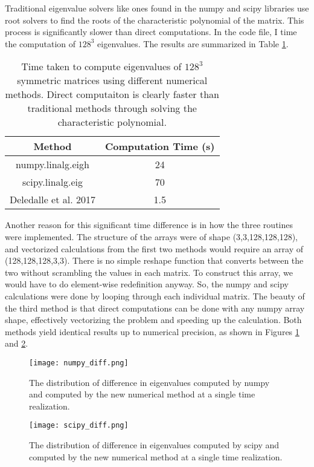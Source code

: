 \documentclass{article}
\begin{document}
Traditional eigenvalue solvers like ones found in the numpy and scipy libraries use root solvers to find the roots of the characteristic polynomial of the matrix. This process is significantly slower than direct computations. In the code file, I time the computation of $128^3$ eigenvalues. The results are summarized in Table \ref{tab:timings}.
\begin{table}[H]
    \centering
    \begin{tabular}{|c|c|}
    \hline
        Method & Computation Time (s) \\
        \hline
        \hline
         numpy.linalg.eigh&24 \\
         scipy.linalg.eig &70 \\
         Deledalle et al. 2017 & 1.5\\
         \hline
    \end{tabular}
    \caption{Time taken to compute eigenvalues of $128^3$ symmetric matrices using different numerical methods. Direct computaiton is clearly faster than traditional methods through solving the characteristic polynomial.}
    \label{tab:timings}
\end{table}
Another reason for this significant time difference is in how the three routines were implemented. The structure of the arrays were of shape (3,3,128,128,128), and vectorized calculations from the first two methods would require an array of (128,128,128,3,3). There is no simple reshape function that converts between the two without scrambling the values in each matrix. To construct this array, we would have to do element-wise redefinition anyway. So, the numpy and scipy calculations were done by looping through each individual matrix. The beauty of the third method is that direct computations can be done with any numpy array shape, effectively vectorizing the problem and speeding up the calculation. Both methods yield identical results up to numerical precision, as shown in Figures \ref{fig:numpydiff} and \ref{fig:scipydiff}. 
\begin{figure}[H]
    \centering
    \texttt{[image: numpy\_diff.png]}
    \caption{The distribution of difference in eigenvalues computed by numpy and computed by the new numerical method at a single time realization.}
    \label{fig:numpydiff}
\end{figure}
\begin{figure}[H]
    \centering
    \texttt{[image: scipy\_diff.png]}
    \caption{The distribution of difference in eigenvalues computed by scipy and computed by the new numerical method at a single time realization.}
    \label{fig:scipydiff}
\end{figure}
\end{document}
